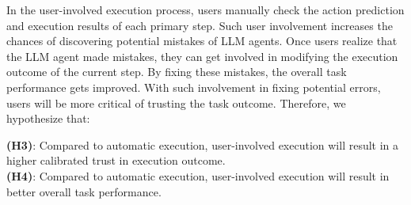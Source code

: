 In the user-involved execution process, users manually check the action prediction and execution results of each primary step. 
Such user involvement increases the chances of discovering potential mistakes of LLM agents.
Once users realize that the LLM agent made mistakes, they can get involved in modifying the execution outcome of the current step. 
By fixing these mistakes, the overall task performance gets improved. 
With such involvement in fixing potential errors, users will be more critical of trusting the task outcome. 
Therefore, we hypothesize that:
\begin{framed}
\noindent\textbf{(H3)}: Compared to automatic execution, user-involved execution will result in a {higher} calibrated trust {in execution outcome}.\\
\noindent\textbf{(H4)}: Compared to automatic execution, user-involved execution will result in better overall task performance.
\end{framed}
